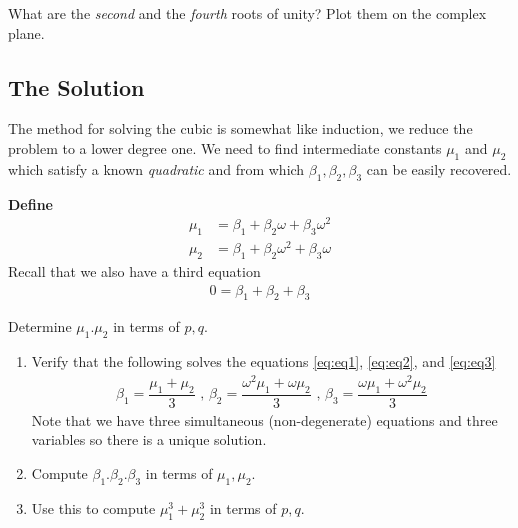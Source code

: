 \begin{questions}[resume]
  \item What are the \emph{second} and the \emph{fourth} roots of unity? Plot them on the complex plane.
\end{questions}






\newpage
\subsection{The Solution}
  The method for solving the cubic is somewhat like induction, we reduce the problem to a lower degree one. We need to find intermediate constants $ \mu_1$ and $ \mu_2$ which satisfy a known \emph{quadratic} and from which $ \beta_1, \beta_2, \beta_3$ can be easily recovered.

  \textbf{Define}
  \begin{align}
    \label{eq:eq1}
    \mu_1 &= \beta_1 + \beta_2 \omega + \beta_3 \omega^2 \\
    \label{eq:eq2}
    \mu_2 &= \beta_1 + \beta_2 \omega^2 + \beta_3 \omega
  \end{align}
Recall that we also have a third equation 
\begin{align}
  \label{eq:eq3}
  0 = \beta_1 + \beta_2 + \beta_3
\end{align}

\begin{questions}[resume]
  \item Determine $ \mu_1 .\mu_2$ in terms of $p, q$.
\end{questions}

\begin{questions}[resume]
  \item 
  \begin{enumerate}
    \item Verify that the following solves the equations \eqref{eq:eq1}, \eqref{eq:eq2}, and \eqref{eq:eq3} 
      \begin{align*}
        \beta_1 = \dfrac{\mu_1 + \mu_2}{3} 
        \mbox { , } \beta_2 = \dfrac{\omega^2 \mu_1 + \omega \mu_2}{3}
        \mbox { , } \beta_3 = \dfrac{\omega \mu_1 + \omega^2 \mu_2}{3}
      \end{align*}
    Note that we have three simultaneous (non-degenerate) equations and three variables so there is a unique solution.
    \item Compute $ \beta_1 . \beta_2 . \beta_3$ in terms of $ \mu_1, \mu_2$.
    \item Use this to compute $ \mu_1^3 + \mu_2^3$ in terms of $p, q$.
  \end{enumerate}
\end{questions}


